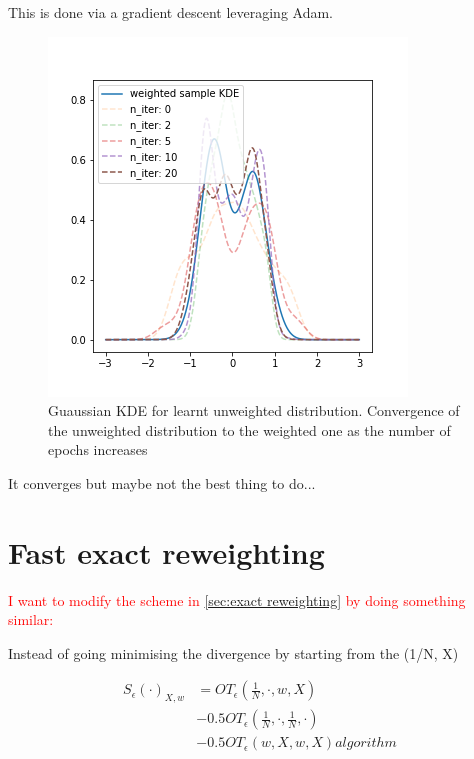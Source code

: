 \documentclass[%
reprint,
amsmath,amssymb,
aps,
]{revtex4-2}
\newcommand\todo[1]{\textcolor{red}{#1}}
\begin{document}
		
		This is done via a gradient descent leveraging Adam.
		
		\begin{figure}
			\includegraphics[width=\linewidth]{LearntDist}
			\caption{
				Guaussian KDE for learnt unweighted distribution.
				Convergence of the unweighted distribution to the weighted one as the number of epochs increases
				}
			\label{fig:learntResampling}
		\end{figure}	
		
		It converges but maybe not the best thing to do...
		
		
	\section{Fast exact reweighting}
	\label{sec:fast reweighting}
		\todo{I want to modify the scheme in \cref{sec:exact reweighting} by doing something similar:}
		
		Instead of going minimising the divergence by starting from the (1/N, X)
		
		\begin{align*} 
			S_\epsilon(\cdot)_{X, w} 
			&= OT_{\epsilon}\left(\frac 1 N, \cdot, w, X\right) \\
			&- 0.5 OT_\epsilon\left(\frac 1 N, \cdot, \frac 1 N, \cdot \right) \\ 
			&- 0.5 OT_\epsilon(w, X, w, X)algorithm
		\end{align*}
		
\end{document}
